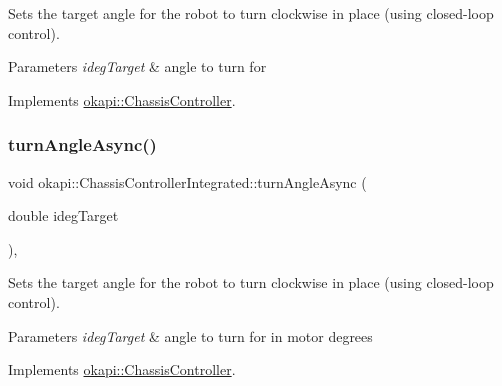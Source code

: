 Sets the target angle for the robot to turn clockwise in place (using closed-\/loop control).


\begin{DoxyParams}{Parameters}
{\em ideg\+Target} & angle to turn for \\
\hline
\end{DoxyParams}


Implements \mbox{\hyperlink{classokapi_1_1ChassisController_a87fc1f88bf06340d8f022a8c185b5e87}{okapi\+::\+Chassis\+Controller}}.

\mbox{\label{classokapi_1_1ChassisControllerIntegrated_abd638be1352919fb211e9b70c181d940}} 
\subsubsection{\texorpdfstring{turnAngleAsync()}{turnAngleAsync()}\hspace{0.1cm}{\footnotesize\ttfamily [2/2]}}
{\footnotesize\ttfamily void okapi\+::\+Chassis\+Controller\+Integrated\+::turn\+Angle\+Async (\begin{DoxyParamCaption}\item[{double}]{ideg\+Target }\end{DoxyParamCaption})\hspace{0.3cm}{\ttfamily [override]}, {\ttfamily [virtual]}}

Sets the target angle for the robot to turn clockwise in place (using closed-\/loop control).


\begin{DoxyParams}{Parameters}
{\em ideg\+Target} & angle to turn for in motor degrees \\
\hline
\end{DoxyParams}


Implements \mbox{\hyperlink{classokapi_1_1ChassisController_a35cadd99478629637b4bd3a5e709871a}{okapi\+::\+Chassis\+Controller}}.

\mbox{\label{classokapi_1_1ChassisControllerIntegrated_a2af994f5ddc68a48d7692fd16ca590c0}} 
